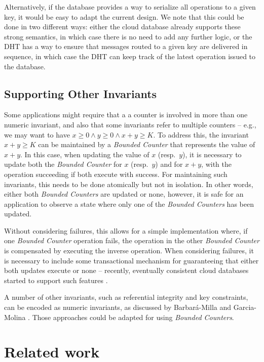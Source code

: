 \documentclass[conference]{IEEEtran}
\newcommand{\InvCounter}{\emph{Bounded Counter}}
\newcommand{\InvCounters}{\emph{Bounded Counters}}
\begin{document}
Alternatively, if the database provides a way to serialize 
all operations to a given key, it would be easy to adapt the current design. 
We note that this could be done in two different ways: either the 
cloud database already supports these strong semantics, 
in which case there is no need to add any further logic, 
or the DHT has a way to ensure that messages routed to a given 
key are delivered in sequence, in which case the DHT can keep 
track of the latest operation issued to the database.

\subsection{Supporting Other Invariants}

Some applications might require that a
a counter is involved in more than one numeric invariant, and also that some
invariants refer to multiple counters -- e.g., we may want to have $x \geq 0 \wedge y \geq 0 \wedge x + y \geq K$.
To address this, the invariant $x + y \geq K$ can be maintained by a \InvCounter{} that represents the value of $x + y$.
In this case, when updating the value of $x$ (resp.\ $y$), it is necessary to update 
both the \InvCounter{} for $x$ (resp.\ $y$) and for $x + y$, with the operation succeeding 
if both execute with success. 
For maintaining such invariants, this needs to be done atomically but not in isolation. In other words,
either both \InvCounters{} are updated or none, however, it is safe for an application to observe 
a state where only one of the \InvCounters{} has been updated.

Without considering failures, this allows for a simple implementation where, if one
\InvCounter{} operation fails, the operation in the other \InvCounter{} is  
compensated \cite{sagas} by executing the inverse operation.
When considering failures, it is necessary to include some transactional mechanism 
for guaranteeing that either both updates execute or none -- recently, eventually consistent
cloud databases started to support such features \cite{cops,eiger}.

A number of other invariants, such as referential integrity and 
key constraints, can be encoded as numeric invariants,
as discussed by Barbará-Milla and Garcia-Molina \cite{demarcation}.
Those approaches could be adapted for using \InvCounters{}.







\section{Related work}\label{sec:related}
\label{sec:related-work}
\end{document}
